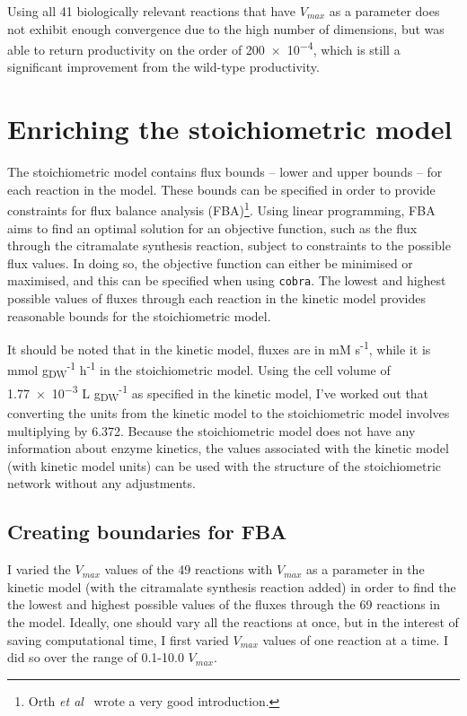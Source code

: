 \documentclass[parskip=full]{scrreprt}
\begin{document}
Using all 41 biologically relevant reactions that have $V_{max}$ as a parameter does not exhibit enough convergence due to the high number of dimensions, but was able to return productivity on the order of \num{200e-4}, which is still a significant improvement from the wild-type productivity.

\chapter{Enriching the stoichiometric model}
\label{ch:stoich}

The stoichiometric model contains flux bounds -- lower and upper bounds -- for each reaction in the model. These bounds can be specified in order to provide constraints for flux balance analysis (FBA)\footnote{Orth \emph{et al}~\cite{orth_what_2010} wrote a very good introduction.}. Using linear programming, FBA aims to find an optimal solution for an objective function, such as the flux through the citramalate synthesis reaction, subject to constraints to the possible flux values. In doing so, the objective function can either be minimised or maximised, and this can be specified when using \texttt{cobra}. The lowest and highest possible values of fluxes through each reaction in the kinetic model provides reasonable bounds for the stoichiometric model.

It should be noted that in the kinetic model, fluxes are in mM s\textsuperscript{-1}, while it is mmol g\textsubscript{DW}\textsuperscript{-1} h\textsuperscript{-1} in the stoichiometric model. Using the cell volume of \num{1.77e-3} L g\textsubscript{DW}\textsuperscript{-1} as specified in the kinetic model, I’ve worked out that converting the units from the kinetic model to the stoichiometric model involves multiplying by 6.372. Because the stoichiometric model does not have any information about enzyme kinetics, the values associated with the kinetic model (with kinetic model units) can be used with the structure of the stoichiometric network without any adjustments.

\section{Creating boundaries for FBA}
\label{sec:bounds}

I varied the $V_{max}$ values of the 49 reactions with $V_{max}$ as a parameter in the kinetic model (with the citramalate synthesis reaction added) in order to find the the lowest and highest possible values of the fluxes through the 69 reactions in the model. Ideally, one should vary all the reactions at once, but in the interest of saving computational time, I first varied $V_{max}$ values of one reaction at a time. I did so over the range of 0.1-10.0 $V_{max}$.
\end{document}
